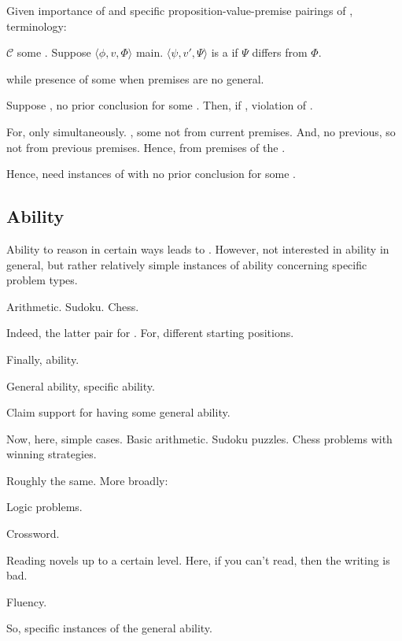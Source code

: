 \begin{note}[\jag{2}]
  Given importance of \ragged{} and specific proposition-value-premise pairings of \ragged{}, terminology:

  \begin{definition}
    \(\mathcal{C}\) some \ragCluster{}.
    Suppose \(\langle \phi,v,\Phi \rangle\) main.
    \(\langle \psi,v',\Psi \rangle\) is a \emph{} if \(\Psi\) differs from \(\Phi\).
  \end{definition}

  \csN{} while presence of some \jag{} when premises are no general.
\end{note}

\begin{note}
  Suppose \ragged{}, no prior conclusion for some \jag{}.
  Then, if \csN{}, violation of \ESU{}.

  For, only \csN{} simultaneously.
  \jag{}, some not from current premises.
  And, no previous, so not from previous premises.
  Hence, \csN{} from premises of the \jag{}.

  Hence, need instances of \ragged{} with no prior conclusion for some \jag{}.
\end{note}


\subsection{Ability}
\label{sec:overview:ability}

\begin{note}[Ability]
  Ability to reason in certain ways leads to .
  However, not interested in ability in general, but rather relatively simple instances of ability concerning specific problem types.

  Arithmetic.
  Sudoku.
  Chess.

  Indeed, the latter pair for .
  For, different starting positions.
  
\end{note}

\begin{note}
  Finally, ability.

  General ability, specific ability.

  Claim support for having some general ability.

  Now, here, simple cases.
  Basic arithmetic.
  Sudoku puzzles.
  Chess problems with winning strategies.

  Roughly the same.
  More broadly:

  Logic problems.

  Crossword.

  Reading novels up to a certain level.
  Here, if you can't read, then the writing is bad.

  Fluency.

  So, specific instances of the general ability.
\end{note}

